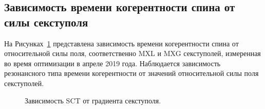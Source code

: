 \subsection{Зависимость времени когерентности спина от силы секступоля}
На Рисунках~\ref{fig:SCT_scan} представлена зависимость времени когерентности спина от относительной силы поля, соответственно MXL и MXG секступолей, измеренная во время оптимизации в апреле 2019 года. Наблюдается зависимость резонансного типа времени когерентности от значений относительной силы поля секступолей.

\begin{figure}[h]\centering
	\caption{Зависимость SCT от градиента секступоля.\label{fig:SCT_scan}}
\end{figure}

